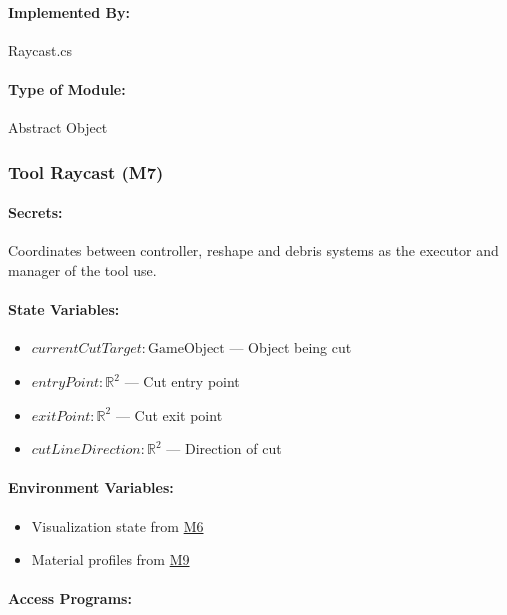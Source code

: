 \documentclass[12pt, titlepage]{article}
\begin{document}
\paragraph{Implemented By:}
Raycast.cs

\paragraph{Type of Module:}
Abstract Object

\newpage

\subsubsection{Tool Raycast (M7)} \label{M7}

\paragraph{Secrets:}
Coordinates between controller, reshape and debris systems as the executor and manager of the tool use.

\paragraph{State Variables:}
\begin{itemize}
\item $currentCutTarget : \text{GameObject}$ --- Object being cut
\item $entryPoint : \mathbb{R}^2$ --- Cut entry point
\item $exitPoint : \mathbb{R}^2$ --- Cut exit point
\item $cutLineDirection : \mathbb{R}^2$ --- Direction of cut
\end{itemize}

\paragraph{Environment Variables:}
\begin{itemize}
\item Visualization state from \hyperref[M6]{M6}
\item Material profiles from \hyperref[M9]{M9}
\end{itemize}

\paragraph{Access Programs:}
\end{document}
